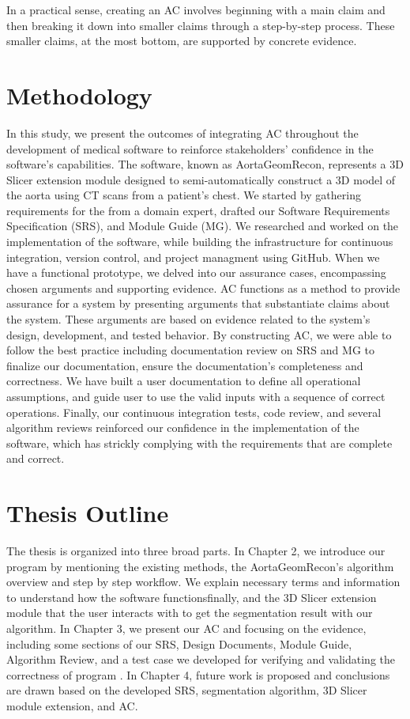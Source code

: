 In a practical sense, creating an AC involves beginning with a main claim and then breaking it down into smaller claims through a step-by-step process. These smaller claims, at the most bottom, are supported by concrete evidence.


\section{Methodology} \label{methodology}
In this study, we present the outcomes of integrating AC throughout the development of medical software to reinforce stakeholders' confidence in the software's capabilities. The software, known as AortaGeomRecon, represents a 3D Slicer \cite{Kikinis2014} extension module designed to semi-automatically construct a 3D model of the aorta using CT scans from a patient's chest. We started by gathering requirements for the \progname{} from a domain expert, drafted our Software Requirements Specification (SRS), and Module Guide (MG). We researched and worked on the implementation of the software, while building the infrastructure for continuous integration, version control, and project managment using GitHub. When we have a functional prototype, we delved into our assurance cases, encompassing chosen arguments and supporting evidence. AC functions as a method to provide assurance for a system by presenting arguments that substantiate claims about the system. These arguments are based on evidence related to the system's design, development, and tested behavior. By constructing AC, we were able to follow the best practice including documentation review on SRS and MG to finalize our documentation, ensure the documentation's completeness and correctness. We have built a user documentation to define all operational assumptions, and guide user to use the valid inputs with a sequence of correct operations. Finally, our continuous integration tests, code review, and several algorithm reviews reinforced our confidence in the implementation of the software, which has strickly complying with the requirements that are complete and correct.

\section{Thesis Outline} \label{TO}

The thesis is organized into three broad parts. In Chapter 2, we introduce our program \progname{} by mentioning the existing methods, the AortaGeomRecon's algorithm overview and step by step  workflow. We explain necessary terms and information to understand how the software functionsfinally, and the 3D Slicer \cite{Kikinis2014} extension module that the user interacts with to get the segmentation result with our algorithm. In Chapter 3, we present our AC and focusing on the evidence, including  some sections of our SRS, Design Documents, Module Guide, Algorithm Review, and a test case we developed for verifying and validating the correctness of program \progname{}. In Chapter 4, future work is proposed and conclusions are drawn based on the developed SRS, segmentation algorithm, 3D Slicer module extension, and AC.